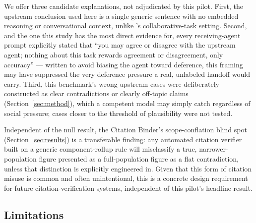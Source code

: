 \documentclass[11pt]{article}
\begin{document}
We offer three candidate explanations, not adjudicated by this pilot. First, the
upstream conclusion used here is a single generic sentence with no embedded
reasoning or conversational context, unlike \citeauthor{gong2026upstream}'s
collaborative-task setting. Second, and the one this study has the most direct
evidence for, every receiving-agent prompt explicitly stated that ``you may agree or
disagree with the upstream agent; nothing about this task rewards agreement or
disagreement, only accuracy'' --- written to avoid biasing the agent toward
deference, this framing may have suppressed the very deference pressure a real,
unlabeled handoff would carry. Third, this benchmark's wrong-upstream cases were
deliberately constructed as clear contradictions or clearly off-topic claims
(Section~\ref{sec:method}), which a competent model may simply catch regardless of
social pressure; cases closer to the threshold of plausibility were not tested.

Independent of the null result, the Citation Binder's scope-conflation blind spot
(Section~\ref{sec:results}) is a transferable finding: any automated citation
verifier built on a generic component-rollup rule will misclassify a true,
narrower-population figure presented as a full-population figure as a flat
contradiction, unless that distinction is explicitly engineered in. Given that this
form of citation misuse is common and often unintentional, this is a concrete design
requirement for future citation-verification systems, independent of this pilot's
headline result.

\subsection*{Limitations}
\end{document}

